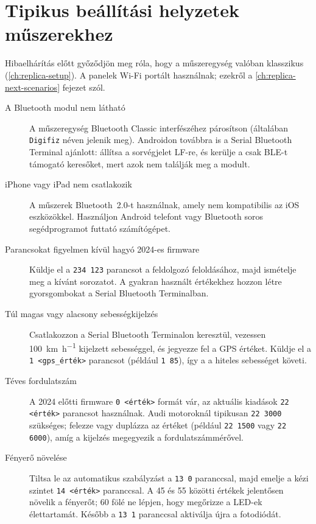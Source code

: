 \chapter{Tipikus beállítási helyzetek \ReplicaGenOne{} műszerekhez}\label{ch:replica-scenarios}

Hibaelhárítás előtt győződjön meg róla, hogy a műszeregység valóban klasszikus \ReplicaGenOne{} (\autoref{ch:replica-setup}). A \ReplicaNextLong{} panelek Wi-Fi portált használnak; ezekről a \autoref{ch:replica-next-scenarios} fejezet szól.

\begin{description}
    \item[A Bluetooth modul nem látható] A műszeregység Bluetooth Classic interfészéhez párosítson (általában \texttt{Digifiz} néven jelenik meg). Androidon továbbra is a Serial Bluetooth Terminal ajánlott: állítsa a sorvégjelet LF-re, és kerülje a csak BLE-t támogató keresőket, mert azok nem találják meg a modult.
    \item[iPhone vagy iPad nem csatlakozik] A \ReplicaGenOneShort{} műszerek Bluetooth~2.0-t használnak, amely nem kompatibilis az iOS eszközökkel. Használjon Android telefont vagy Bluetooth soros segédprogramot futtató számítógépet.
    \item[Parancsokat figyelmen kívül hagyó 2024-es firmware] Küldje el a \verb|234 123| parancsot a feldolgozó feloldásához, majd ismételje meg a kívánt sorozatot. A gyakran használt értékekhez hozzon létre gyorsgombokat a Serial Bluetooth Terminalban.
    \item[Túl magas vagy alacsony sebességkijelzés] Csatlakozzon a Serial Bluetooth Terminalon keresztül, vezessen \SI{100}{\kilo\metre\per\hour} kijelzett sebességgel, és jegyezze fel a GPS értéket. Küldje el a \verb|1 <gps_érték>| parancsot (például \verb|1 85|), így a  a hiteles sebességet követi.
    \item[Téves fordulatszám] A 2024 előtti firmware \verb|0 <érték>| formát vár, az aktuális kiadások \verb|22 <érték>| parancsot használnak. Audi motoroknál tipikusan \verb|22 3000| szükséges; felezze vagy duplázza az értéket (például \verb|22 1500| vagy \verb|22 6000|), amíg a kijelzés megegyezik a fordulatszámmérővel.
    \item[Fényerő növelése] Tiltsa le az automatikus szabályzást a \verb|13 0| paranccsal, majd emelje a kézi szintet \verb|14 <érték>| paranccsal. A 45 és 55 közötti értékek jelentősen növelik a fényerőt; 60 fölé ne lépjen, hogy megőrizze a LED-ek élettartamát. Később a \verb|13 1| paranccsal aktiválja újra a fotodiódát.

\end{description}

